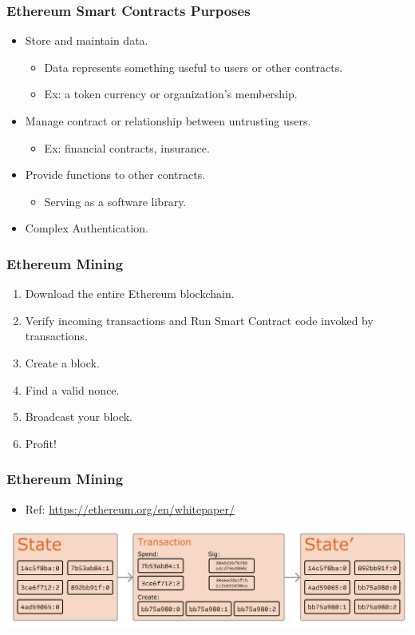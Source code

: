 \documentclass{beamer}
\begin{document}
\begin{frame}
  \frametitle{Ethereum Smart Contracts Purposes}
  \pause
 	\begin{itemize}
 		\item Store and maintain data.
 		\begin{itemize}
			\item Data represents something useful to users or other contracts.
			\item Ex: a token currency or organization's membership.
		\end{itemize}
		\pause
		\item Manage contract or relationship between untrusting users.
		\begin{itemize}
			\item Ex: financial contracts, insurance.
		\end{itemize} \pause
		\item Provide functions to other contracts.
		\begin{itemize}
			\item Serving as a software library.
		\end{itemize}
		\item Complex Authentication.
 	\end{itemize}
\end{frame}
\begin{frame}
  \frametitle{Ethereum Mining}
 	\begin{enumerate}
 		\item Download the entire Ethereum blockchain.
		\item Verify incoming transactions and Run Smart Contract code invoked by transactions.
		\item Create a block. 
		\item Find a valid nonce. 
		\item Broadcast your block. 
		\item Profit!
 	\end{enumerate}
\end{frame}
\begin{frame}
  \frametitle{Ethereum Mining}
  	\begin{itemize}
  		\item Ref: \url{https://ethereum.org/en/whitepaper/}
  	\end{itemize}
 	\centering
	\includegraphics[scale=0.45]{states}
\end{frame}
\end{document}
